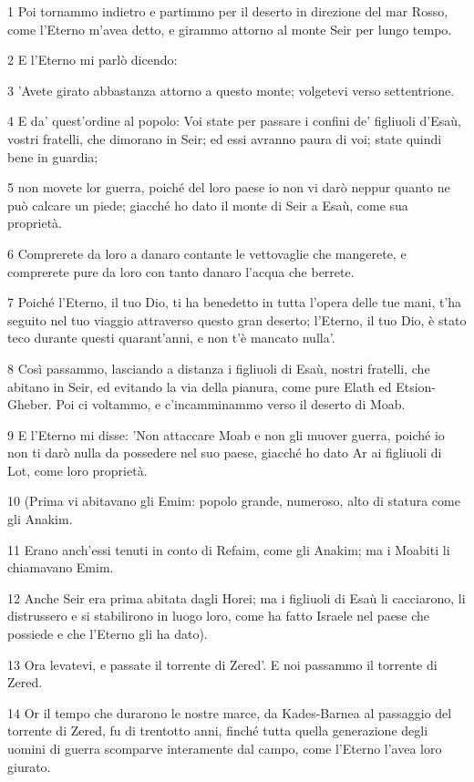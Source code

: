 \par 1 Poi tornammo indietro e partimmo per il deserto in direzione del mar Rosso, come l'Eterno m'avea detto, e girammo attorno al monte Seir per lungo tempo.
\par 2 E l'Eterno mi parlò dicendo:
\par 3 'Avete girato abbastanza attorno a questo monte; volgetevi verso settentrione.
\par 4 E da' quest'ordine al popolo: Voi state per passare i confini de' figliuoli d'Esaù, vostri fratelli, che dimorano in Seir; ed essi avranno paura di voi; state quindi bene in guardia;
\par 5 non movete lor guerra, poiché del loro paese io non vi darò neppur quanto ne può calcare un piede; giacché ho dato il monte di Seir a Esaù, come sua proprietà.
\par 6 Comprerete da loro a danaro contante le vettovaglie che mangerete, e comprerete pure da loro con tanto danaro l'acqua che berrete.
\par 7 Poiché l'Eterno, il tuo Dio, ti ha benedetto in tutta l'opera delle tue mani, t'ha seguito nel tuo viaggio attraverso questo gran deserto; l'Eterno, il tuo Dio, è stato teco durante questi quarant'anni, e non t'è mancato nulla'.
\par 8 Così passammo, lasciando a distanza i figliuoli di Esaù, nostri fratelli, che abitano in Seir, ed evitando la via della pianura, come pure Elath ed Etsion-Gheber. Poi ci voltammo, e c'incamminammo verso il deserto di Moab.
\par 9 E l'Eterno mi disse: 'Non attaccare Moab e non gli muover guerra, poiché io non ti darò nulla da possedere nel suo paese, giacché ho dato Ar ai figliuoli di Lot, come loro proprietà.
\par 10 (Prima vi abitavano gli Emim: popolo grande, numeroso, alto di statura come gli Anakim.
\par 11 Erano anch'essi tenuti in conto di Refaim, come gli Anakim; ma i Moabiti li chiamavano Emim.
\par 12 Anche Seir era prima abitata dagli Horei; ma i figliuoli di Esaù li cacciarono, li distrussero e si stabilirono in luogo loro, come ha fatto Israele nel paese che possiede e che l'Eterno gli ha dato).
\par 13 Ora levatevi, e passate il torrente di Zered'. E noi passammo il torrente di Zered.
\par 14 Or il tempo che durarono le nostre marce, da Kades-Barnea al passaggio del torrente di Zered, fu di trentotto anni, finché tutta quella generazione degli uomini di guerra scomparve interamente dal campo, come l'Eterno l'avea loro giurato.
